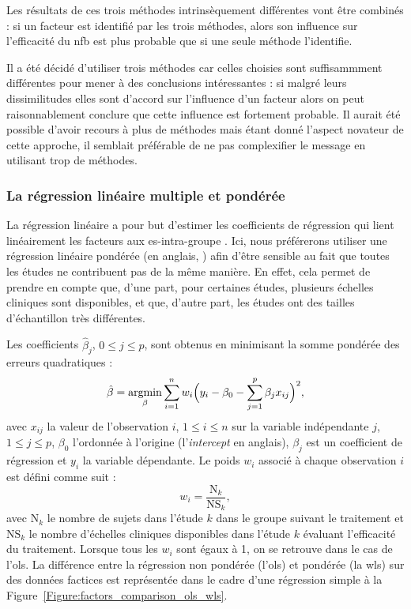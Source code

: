 Les résultats de ces trois méthodes intrinsèquement différentes vont être combinés : si un facteur est identifié par les trois méthodes, alors son influence sur l'efficacité du 
\gls{nfb} est plus probable que si une seule méthode l'identifie. 

Il a été décidé d'utiliser trois méthodes car celles choisies sont suffisammment différentes pour mener à des conclusions intéressantes : si malgré leurs dissimilitudes 
elles sont d'accord sur l'influence d'un facteur alors on peut raisonnablement conclure que cette influence est fortement probable. Il aurait été possible
d'avoir recours à plus de méthodes mais étant donné l'aspect novateur de cette approche, il semblait préférable de ne pas complexifier le message en utilisant trop de méthodes.

\subsubsection{La régression linéaire multiple et pondérée} \label{wls_part}
La régression linéaire a pour but d'estimer les coefficients de régression qui lient linéairement les facteurs aux \gls{es}-intra-groupe \citep{Montgomery2012}. Ici, nous préférerons 
utiliser une régression linéaire pondérée (en anglais, ) afin d'être sensible au fait que toutes les études ne contribuent pas de la même manière. 
En effet, cela permet de prendre en compte que, d'une part, pour certaines études, plusieurs échelles cliniques sont disponibles, et que, d'autre part, les études ont des 
tailles d'échantillon très différentes.

Les coefficients $\hat{\beta}_{j}$, $0 \leq j \leq p$, sont obtenus en minimisant la somme pondérée des erreurs quadratiques :
\begin{equation}
\label{eq:factors_wls-minimization}
\hat{\beta} = \operatorname*{argmin}_\beta \sum_{i=1}^{n} w_{i} \Big(y_i - \beta_0 - \sum_{j=1}^{p}\beta_{j}x_{ij}\Big)^2,
\end{equation} 
avec $x_{ij}$ la valeur de l'observation $i$, $1 \leq i \leq n$ sur la variable indépendante $j$, $1 \leq j \leq p$, $\beta_0$ l'ordonnée à l'origine (l'\textit{intercept} en anglais), 
$\beta_j$ est un coefficient de régression et $y_i$ la variable dépendante.
Le poids $w_{i}$ associé à chaque observation $i$ est défini comme suit : 
\begin{equation}
\label{eq:weight_WLS}
w_{i} = \frac{\text{N}_{k}}{\text{NS}_{k}},
\end{equation} 
avec $\text{N}_{k}$  le nombre de sujets dans l'étude $k$ dans le groupe suivant le traitement et $\text{NS}_{k}$  le nombre 
d'échelles cliniques disponibles dans l'étude $k$ évaluant l'efficacité du traitement. Lorsque tous les $w_{i}$ sont égaux à 1, on se retrouve dans le
cas de l'\gls{ols}. La différence entre la régression non pondérée (l'\gls{ols}) et pondérée (la \gls{wls}) sur des données factices est représentée dans le cadre
d'une régression simple à la Figure~\ref{Figure:factors_comparison_ols_wls}.

